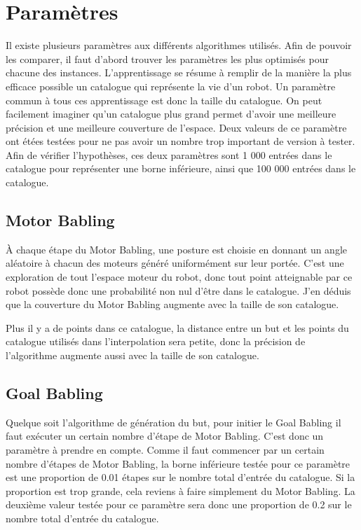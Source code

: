 \documentclass[11pt,french]{report}
\begin{document}
\section{Paramètres}

Il existe plusieurs paramètres aux différents algorithmes utilisés.
Afin de pouvoir les comparer, il faut d'abord trouver les paramètres les plus optimisés pour chacune des instances.
L'apprentissage se résume à remplir de la manière la plus efficace possible un catalogue qui représente la vie d'un robot.
Un paramètre commun à tous ces apprentissage est donc la taille du catalogue.
On peut facilement imaginer qu'un catalogue plus grand permet d'avoir une meilleure précision et une meilleure couverture de l'espace.
Deux valeurs de ce paramètre ont étées testées pour ne pas avoir un nombre trop important de version à tester.
Afin de vérifier l'hypothèses, ces deux paramètres sont 1 000 entrées dans le catalogue pour représenter une borne inférieure, ainsi que 100 000 entrées dans le catalogue.

\subsection{Motor Babling}

\`A chaque étape du Motor Babling, une posture est choisie en donnant un angle aléatoire à chacun des moteurs généré uniformément sur leur portée.
C'est une exploration de tout l'espace moteur du robot, donc tout point atteignable par ce robot possède donc une probabilité non nul d'être dans le catalogue.
J'en déduis que la couverture du Motor Babling augmente avec la taille de son catalogue.

Plus il y a de points dans ce catalogue, la distance entre un but et les points du catalogue utilisés dans l'interpolation sera petite, donc la précision de l'algorithme augmente aussi avec la taille de son catalogue.

\subsection{Goal Babling}

Quelque soit l'algorithme de génération du but, pour initier le Goal Babling il faut exécuter un certain nombre d'étape de Motor Babling.
C'est donc un paramètre à prendre en compte.
Comme il faut commencer par un certain nombre d'étapes de Motor Babling, la borne inférieure testée pour ce paramètre est une proportion de 0.01 étapes sur le nombre total d'entrée du catalogue.
Si la proportion est trop grande, cela reviens à faire simplement du Motor Babling.
La deuxième valeur testée pour ce paramètre sera donc une proportion de 0.2 sur le nombre total d'entrée du catalogue.
\end{document}
